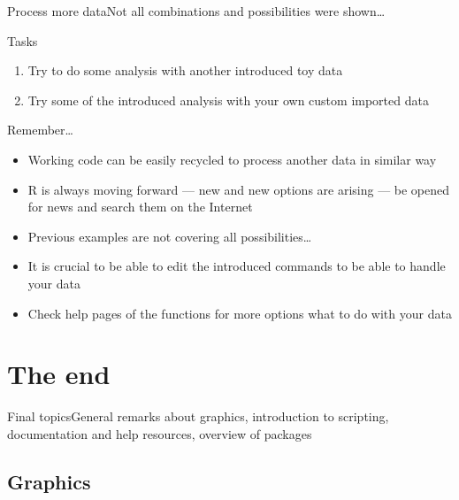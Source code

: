 \documentclass[compress, ucs, xelatex, 11pt, xcolor=svgnames, aspectratio=169,
	hyperref={
		bookmarks=true,
		unicode=true,
		colorlinks=true,
		pdftitle={Molecular data in R},
		plainpages=false,
		pdfauthor={Vojtech Zeisek},
		pdfsubject={Course about phylogeny and evolution in R},
		pdfcreator={XeLaTeX},
		pdfkeywords={R, evolution, phylogeny, molecular data},
		linkcolor=Crimson, %
		anchorcolor=Magenta, %
		citecolor=Magenta, %
		filecolor=Magenta, %
		menucolor=Magenta, %
		urlcolor=DodgerBlue, %
		pdftex},
	url={hyphens, lowtilde} %
	]{beamer}
\begin{document}
\begin{frame}{Process more data}{Not all combinations and possibilities were shown\ldots}
	\begin{exampleblock}{Tasks}
		\begin{enumerate}
			\item Try to do some analysis with another introduced toy data
			\item Try some of the introduced analysis with your own custom imported data
		\end{enumerate}
	\end{exampleblock}
	\begin{alertblock}{Remember\ldots}
		\begin{itemize}
			\item Working code can be easily recycled to process another data in similar way
			\item R is always moving forward --- new and new options are arising --- be opened for news and search them on the Internet
			\item Previous examples are not covering all possibilities\ldots
			\item It is crucial to be able to edit the introduced commands to be able to handle your data
			\item Check help pages of the functions for more options what to do with your data
		\end{itemize}
	\end{alertblock}
\end{frame}

\section{The end}

\begin{frame}{Final topics}{General remarks about graphics, introduction to scripting, documentation and help resources, overview of packages}
	\tableofcontents[currentsection, sectionstyle=show/hide, hideothersubsections]
\end{frame}

\subsection{Graphics}
\end{document}
